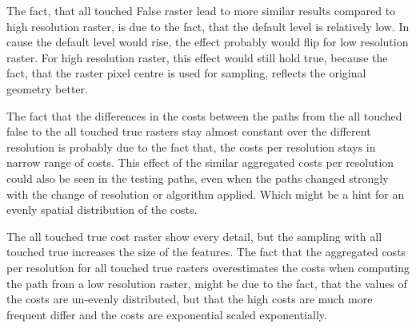 The fact, that all touched False raster lead to more similar results compared to high resolution raster, is due to the fact, that the default level is relatively low.
In cause the default level would rise, the effect probably would flip for low resolution raster.
For high resolution raster, this effect would still hold true, because the fact, that the raster pixel centre is used for sampling, reflects the original geometry better.

The fact that the differences in the costs between the paths from the all touched false to the all touched true rasters stay almost constant over the different resolution is probably due to the fact that, the costs per resolution stays in narrow range of costs.
This effect of the similar aggregated costs per resolution could also be seen in the testing paths, even when the paths changed strongly with the change of resolution or algorithm applied.
Which might be a hint for an evenly spatial distribution of the costs.

The all touched true cost raster show every detail, but the sampling with all touched true increases the size of the features.
The fact that the aggregated costs per resolution for all touched true rasters overestimates the costs when computing the path from a low resolution raster, might be due to the fact, that the values of the costs are un-evenly distributed, but that the high costs are much more frequent differ and the costs are exponential scaled exponentially.

